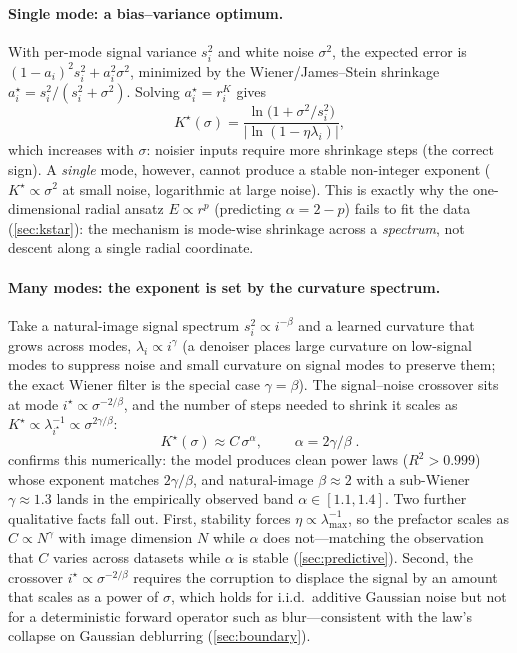 \paragraph{Single mode: a bias--variance optimum.}
With per-mode signal variance $s_i^2$ and white noise $\sigma^2$, the expected error is
$(1-a_i)^2 s_i^2 + a_i^2\sigma^2$, minimized by the Wiener/James--Stein shrinkage
$a_i^\star = s_i^2/(s_i^2+\sigma^2)$. Solving $a_i^\star=r_i^K$ gives
\begin{equation}
K^\star(\sigma) = \frac{\ln\!\big(1+\sigma^2/s_i^2\big)}{\lvert\ln(1-\eta\lambda_i)\rvert},
\end{equation}
which increases with $\sigma$: noisier inputs require more shrinkage steps (the correct
sign). A \emph{single} mode, however, cannot produce a stable non-integer exponent
($K^\star\!\propto\!\sigma^2$ at small noise, logarithmic at large noise). This is exactly
why the one-dimensional radial ansatz $E\!\propto\! r^p$ (predicting $\alpha=2-p$) fails to
fit the data (\cref{sec:kstar}): the mechanism is mode-wise shrinkage across a
\emph{spectrum}, not descent along a single radial coordinate.

\paragraph{Many modes: the exponent is set by the curvature spectrum.}
Take a natural-image signal spectrum $s_i^2\propto i^{-\beta}$ and a learned curvature
that grows across modes, $\lambda_i\propto i^{\gamma}$ (a denoiser places large curvature
on low-signal modes to suppress noise and small curvature on signal modes to preserve
them; the exact Wiener filter is the special case $\gamma=\beta$). The signal--noise
crossover sits at mode $i^\star\propto\sigma^{-2/\beta}$, and the number of steps needed
to shrink it scales as $K^\star\propto\lambda_{i^\star}^{-1}\propto\sigma^{2\gamma/\beta}$:
\begin{equation}
K^\star(\sigma)\approx C\,\sigma^{\alpha}, \qquad \boxed{\;\alpha = 2\gamma/\beta\;}.
\end{equation}
 confirms this numerically: the model produces clean power laws
($R^2>0.999$) whose exponent matches $2\gamma/\beta$, and natural-image $\beta\!\approx\!2$
with a sub-Wiener $\gamma\!\approx\!1.3$ lands in the empirically observed band
$\alpha\in[1.1,1.4]$. Two further qualitative facts fall out. First, stability forces
$\eta\propto\lambda_{\max}^{-1}$, so the prefactor scales as $C\propto N^{\gamma}$ with
image dimension $N$ while $\alpha$ does not---matching the observation that $C$ varies
across datasets while $\alpha$ is stable (\cref{sec:predictive}). Second, the crossover
$i^\star\propto\sigma^{-2/\beta}$ requires the corruption to displace the signal by an
amount that scales as a power of $\sigma$, which holds for i.i.d.\ additive Gaussian noise
but not for a deterministic forward operator such as blur---consistent with the law's
collapse on Gaussian deblurring (\cref{sec:boundary}).

